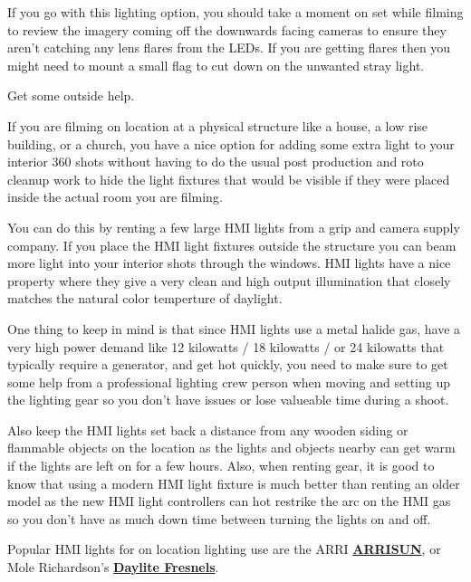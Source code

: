 \begin{fullwidth}
If you go with this lighting option, you should take a moment on set while filming to review the imagery coming off the downwards facing cameras to ensure they aren't catching any lens flares from the LEDs. If you are getting flares then you might need to mount a small flag to cut down on the unwanted stray light.

{\large Get some outside help. \par}

If you are filming on location at a physical structure like a house, a low rise building, or a church, you have a nice option for adding some extra light to your interior 360 shots without having to do the usual post production and roto cleanup work to hide the light fixtures that would be visible if they were placed inside the actual room you are filming. 

You can do this by renting a few large HMI lights from a grip and camera supply company. If you place the HMI light fixtures outside the structure you can beam more light into your interior shots through the windows. HMI lights have a nice property where they give a very clean and high output illumination that closely matches the natural color temperture of daylight.

One thing to keep in mind is that since HMI lights use a metal halide gas, have a very high power demand like 12 kilowatts / 18 kilowatts / or 24 kilowatts that typically require a generator, and get hot quickly, you need to make sure to get some help from a professional lighting crew person when moving and setting up the lighting gear so you don't have issues or lose valueable time during a shoot.

Also keep the HMI lights set back a distance from any wooden siding or flammable objects on the location as the lights and objects nearby can get warm if the lights are left on for a few hours. Also, when renting gear, it is good to know that using a modern HMI light fixture is much better than renting an older model as the new HMI light controllers can hot restrike the arc on the HMI gas so you don't have as much down time between turning the lights on and off.


Popular HMI lights for on location lighting use are the ARRI \textbf{\href{http://www.arri.com/lighting/lighting_equipment/lampheads/daylight_hmi_lampheads/}{ARRISUN}}, or Mole Richardson's \textbf{\href{http://mole.com/products/index/daylite-fesnels}{Daylite Fresnels}}.


\clearpage
\end{fullwidth}